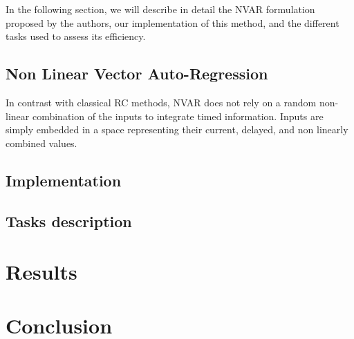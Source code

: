 In the following section, we will describe in detail the NVAR formulation proposed by the authors, our implementation
of this method, and the different tasks used to assess its efficiency.


\subsection{Non Linear Vector Auto-Regression}

In contrast with classical RC methods, NVAR does not rely on a random non-linear combination of the inputs to
integrate timed information. Inputs are simply embedded in a space representing their current, delayed,
and non linearly combined values. 


\subsection{Implementation}

\subsection{Tasks description}

\section{Results}

\section{Conclusion}
